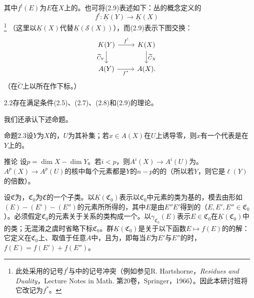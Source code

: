 其中$f^!(E)$为$E$在$X$上的。也可将(2.9)表述如下：丛的概念定义的
\begin{equation}f^!:\underline K(Y)\longrightarrow\underline K(X)\tag{2.10}\end{equation}
\footnote{此处采用的记号$f^!$与中的记号冲突（例如参见R. Hartshorne，\textit{Residues and Duality}，Lecture Notes in Math. 第20卷，Springer，1966）。因此本研讨班将它改记为$f^*$。}
（这里以$\underline K(X)$代替$\underline K(\mathscr S(X))$），而(2.9)表示下图交换：
\[
\begin{tikzcd}
K(Y)\arrow[r,"f^!"]\arrow[d,"\widetilde C_Y"'] & K(X)\arrow[d,"\widetilde C_X"]\\
A(Y)\arrow[r,"f^*"'] & A(X).
\end{tikzcd}
\]
（在$\widetilde C$上以所在作下标。）
\begin{SGAresult}{}{2.2}存在满足条件(2.5)、(2.7)、(2.8)和(2.9)的理论。\end{SGAresult}
我们还承认下述命题。
\begin{SGAresult}{命题}{2.3}设$Y$为$X$的，$U$为其补集；若$x\in A(X)$在$U$上诱导零，则$x$有一个代表是在$Y$上的。\end{SGAresult}

\begin{SGAresult}{推论}{}
设$p=\dim X-\dim Y$。若$i<p$，则$A^i(X)\to A^i(U)$为。$A^p(X)\to A^p(U)$的核中每个元素都是$Y$的$n-p$的的（所以若$Y$，则它是$\ell(Y)$的倍数）。
\end{SGAresult}

设$\mathfrak C$为，$\mathfrak C_0$为$\mathfrak C$的一个子类。以$\underline K(\mathfrak C_0)$表示以$\mathfrak C_0$中元素的类为基的，模去由形如$(E)-(E')-(E'')$的元素所所得的，其中$E$是由$E''$$E'$得到的（$E,E',E''\in\mathfrak C_0$）。必须假定$\mathfrak C_0$的元素关于关系的类构成一个。以$\gamma_{\mathfrak C_0}(E)$表示$E\in\mathfrak C_0$在$\underline K(\mathfrak C_0)$中的类；无混淆之虞时省略下标$\mathfrak C_0$。群$\underline K(\mathfrak C_0)$是关于以下函数$E\mapsto f(E)$的的解：它定义在$\mathfrak C_0$上、取值于任意$A$中，且为，即每当$E$为$E'$与$E''$的时，$f(E)=f(E')+f(E'')$。


